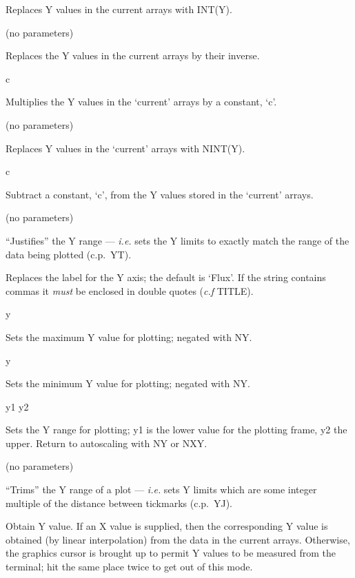 \begin {description}
Replaces Y values in the current arrays with INT(Y).

\item [YINV] (no parameters)

Replaces the Y values in the current arrays by their inverse.

\item [YMULT] c

Multiplies the Y values in the `current' arrays by a constant, `c'.

\item [YNINT] (no parameters)

Replaces Y values in the `current' arrays with NINT(Y).

\item [YSUB] c

Subtract a constant, `c', from the Y values stored in the `current' arrays.

\item [YJ] (no parameters)

``Justifies'' the Y range --- {\em i.e.} sets the Y limits to exactly
match the range of the data being plotted (c.p.\ YT).

\item [YLAB] [string]

Replaces the label for the Y axis; the default is `Flux'. If the
string contains commas it {\em must} be enclosed in double quotes
({\it c.f} TITLE).

\item [YMAX] y

Sets the maximum Y value for plotting; negated with NY.

\item [YMIN] y

Sets the minimum Y value for plotting; negated with NY.

\item [YR] y1 y2

Sets the Y range for plotting; y1 is the lower value for the plotting
frame, y2 the upper. Return to autoscaling with NY or NXY.

\item [YT] (no parameters)

``Trims'' the Y range of a plot --- {\em i.e.} sets Y limits which are
some integer multiple of the distance between tickmarks (c.p.\ YJ).

\item [YV] [Xvalue]

Obtain Y value. If an X value is supplied, then the corresponding Y
value is obtained (by linear interpolation) from the data in the
current arrays. Otherwise, the graphics cursor is brought up to permit
Y values to be measured from the terminal; hit the same place twice to
get out of this mode.


\end{description}
